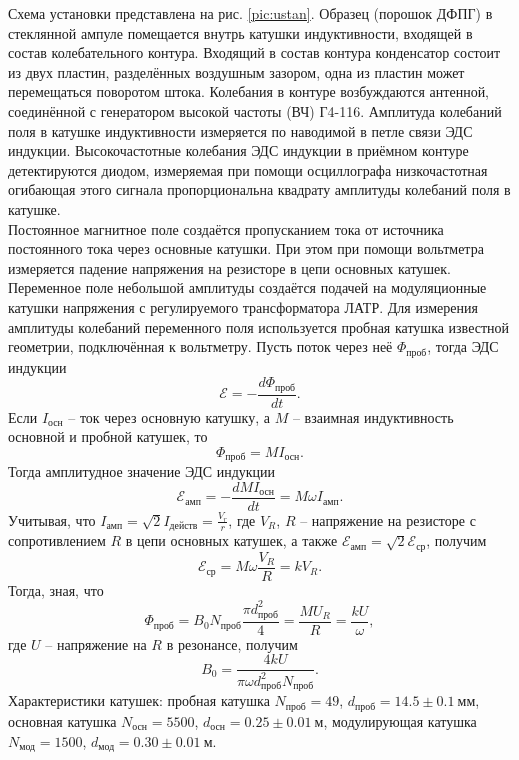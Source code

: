 \documentclass[a4paper,12pt]{article}
\begin{document}
Схема установки представлена на рис. \ref{pic:ustan}. Образец (порошок ДФПГ) в стеклянной ампуле помещается внутрь катушки индуктивности, входящей в состав колебательного контура. Входящий в состав контура конденсатор состоит из двух пластин, разделённых воздушным зазором, одна из пластин может перемещаться поворотом штока. Колебания в контуре возбуждаются антенной, соединённой с генератором высокой частоты (ВЧ) Г4-116. Амплитуда колебаний поля в катушке индуктивности
измеряется по наводимой в петле связи ЭДС индукции. Высокочастотные колебания ЭДС
индукции в приёмном контуре детектируются диодом, измеряемая при помощи
осциллографа низкочастотная огибающая этого сигнала пропорциональна квадрату
амплитуды колебаний поля в катушке.\\
Постоянное магнитное поле создаётся пропусканием тока от источника постоянного тока через основные катушки. При этом при помощи вольтметра измеряется падение напряжения на резисторе в цепи основных катушек. Переменное поле небольшой амплитуды создаётся подачей на модуляционные катушки напряжения с регулируемого трансформатора ЛАТР. Для измерения амплитуды колебаний переменного поля используется пробная катушка известной геометрии, подключённая к вольтметру. Пусть поток через неё $\Phi_{\text{проб}}$, тогда ЭДС индукции
\[\mathcal{E} = - \dfrac{d\Phi_{\text{проб}}}{dt}.\]
Если $I_{\text{осн}}$ -- ток через основную катушку, а $M$ -- взаимная индуктивность основной и пробной катушек, то
\[\Phi_{\text{проб}} = M I_{\text{осн}}.\]
Тогда амплитудное значение ЭДС индукции
\[\mathcal{E}_{\text{амп}} = - \dfrac{dM I_{\text{осн}}}{dt} = M \omega I_{\text{амп}}.\]
Учитывая, что $I_{\text{амп}} = \sqrt{2} I_{\text{действ}}=\frac{V_r}{r}$, где $V_R$, $R$ -- напряжение на резисторе с сопротивлением $R$ в цепи основных катушек, а также $\mathcal{E}_{\text{амп}} = \sqrt{2}\mathcal{E}_{\text{ср}}$, получим
\[\mathcal{E}_{\text{ср}} = M \omega \dfrac{V_R}{R} = k V_R.\]
Тогда, зная, что
\[\Phi_{\text{проб}} = B_0 N_{\text{проб}} \dfrac{\pi d_{\text{проб}}^2}{4} =  \dfrac{MU_R}{R} = \dfrac{k U}{\omega},\]
где $U$ -- напряжение на $R$ в резонансе, получим
\begin{equation}\label{1}
B_0 = \dfrac{4k U}{\pi \omega d^2_{\text{проб}} N_{\text{проб}}}.
\end{equation}
Характеристики катушек: пробная катушка $N_{\text{проб}} = 49$, $d_{\text{проб}} = 14.5\pm 0.1~\text{мм}$, основная катушка $N_{\text{осн}} = 5500$, $d_{\text{осн}} = 0.25\pm 0.01~\text{м}$,  модулирующая катушка $N_{\text{мод}} = 1500$, $d_{\text{мод}} = 0.30\pm 0.01~\text{м}$.
\end{document}

